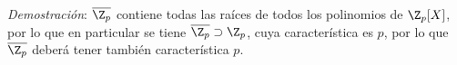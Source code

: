 \begin{prop} \leavevmode
        \item \textit{Demostración}: $\overline{\Z_p}$ contiene todas las raíces de todos los polinomios de $\Z_p[X]$, por lo que en particular se tiene $\overline{\Z_p} \supset\Z_p$, cuya característica es $p$, por lo que $\overline{\Z_p}$ deberá tener también característica $p$.
\end{prop}


